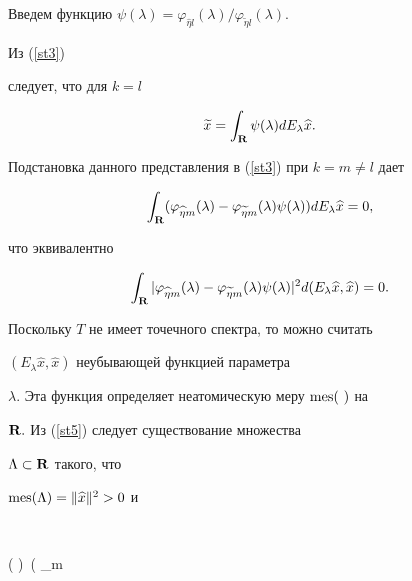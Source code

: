 \begin{pf}
Введем функцию $\psi ( \lambda ) =\varphi_{


\widehat{\eta }l}(\lambda )/\varphi_{\widetilde{\eta }l}(\lambda ).$


Из (\ref{st3})


следует, что для $k=l$ 


$$






\widetilde {x}=\int_{{\bold R }}\psi ( \lambda )


dE_\lambda \widehat {x}.


$$




Подстановка данного представления в (\ref{st3}) при $k=m\neq l$ дает 


$$


\int_{{\bold R }}( \varphi_{\widehat{\eta }m}( \lambda


) -\varphi_{\widetilde{\eta }m}( \lambda ) \psi (


\lambda ) ) dE_\lambda \widehat {x}=0, 


$$


что эквивалентно 


\begin{equation}


\label{st5}


\int_{{\bold R }}| \varphi_{\widehat{\eta }m}(


\lambda ) -\varphi_{\widetilde{\eta }m}( \lambda ) \psi


( \lambda ) |^2d( E_\lambda \widehat {x},\widehat {x}) =0.


\end{equation}


Поскольку $T$ не имеет точечного спектра, то можно считать


$( E_\lambda \widehat {x},\widehat {x}) $ неубывающей функцией параметра


$\lambda $. Эта функция определяет неатомическую меру $\operatorname{mes} (\ )$ на


${\bold R.}$ Из (\ref{st5}) следует существование множества


$\Lambda \subset {\bold R }$ такого, что


$\operatorname{mes}( \Lambda ) =\| \widehat {x}\|^2>0$ и


$$


( \forall \lambda \in \Lambda )\ ( \varphi_{\widehat{\eta }m}



\end{pf}
